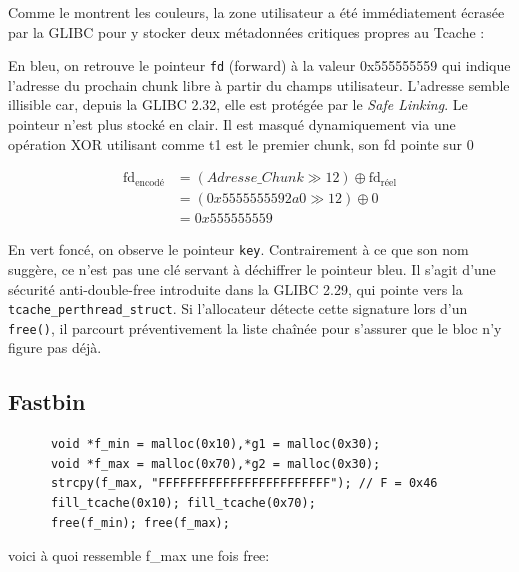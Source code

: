 Comme le montrent les couleurs, la zone utilisateur a été immédiatement écrasée par la GLIBC pour y stocker deux métadonnées critiques propres au Tcache :

En \textcolor{pwndbgblue}{bleu}, on retrouve le pointeur \texttt{fd} (forward) à la valeur 0x555555559 qui
indique l'adresse du prochain chunk libre à partir du champs utilisateur.
L'adresse semble illisible car, depuis la GLIBC 2.32, elle est protégée
par le \textit{Safe Linking}. Le pointeur n'est plus stocké en clair.
Il est masqué dynamiquement via une opération XOR utilisant
comme t1 est le premier chunk, son fd pointe sur 0

$$
      \begin{aligned}
            \text{fd}_{\text{encodé}} & =  (Adresse\_Chunk \gg 12) \oplus \text{fd}_{\text{réel}} \\
                                      & = (0x5555555592a0 \gg 12) \oplus 0                        \\
                                      & =  0x555555559
      \end{aligned}
$$


En \textcolor{pwndbgdarkgreen}{vert foncé}, on observe le pointeur \texttt{key}.
Contrairement à ce que son nom suggère, ce n'est pas une clé servant à déchiffrer
le pointeur bleu. Il s'agit d'une sécurité anti-double-free introduite
dans la GLIBC 2.29, qui pointe vers la \texttt{tcache\_perthread\_struct}.
Si l'allocateur détecte cette signature lors d'un \texttt{free()},
il parcourt préventivement la liste chaînée pour s'assurer que le bloc n'y figure pas
déjà.

\subsection{Fastbin}
\begin{verbatim}
      void *f_min = malloc(0x10),*g1 = malloc(0x30);
      void *f_max = malloc(0x70),*g2 = malloc(0x30);
      strcpy(f_max, "FFFFFFFFFFFFFFFFFFFFFFFF"); // F = 0x46
      fill_tcache(0x10); fill_tcache(0x70);
      free(f_min); free(f_max);
\end{verbatim}

voici à quoi ressemble f\_max une fois free:

